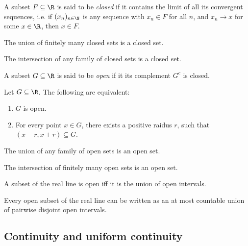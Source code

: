 \documentclass{article}
\begin{document}
\begin{definition}
	A subset $F\subseteq\R$ is said to be \emph{closed} if it contains the limit of all
	its convergent sequences, i.e. if $(x_n)_{n\in\N}$ is any sequence with $x_n\in F$
	for all $n$, and $x_n\to x$ for some $x\in\R$, then $x\in F$.
\end{definition}

\begin{proposition}[2.2]
	The union of finitely many closed sets is a closed set.
\end{proposition}

\begin{proposition}[2.4]
	The intersection of any family of closed sets is a closed set.
\end{proposition}

\begin{definition}
	A subset $G\subseteq\R$ is said to be \emph{open} if it its complement $G^c$ is closed.
\end{definition}

\begin{proposition}[2.6]
	Let $G\subseteq\R$. The following are equivalent:
	\begin{enumerate}
		\item $G$ is open.
		\item For every point $x\in G$, there exists a positive raidus $r$, such that
		      $(x-r,x+r)\subseteq G$.
	\end{enumerate}
\end{proposition}

\begin{proposition}[2.8]
	The union of any family of open sets is an open set.
\end{proposition}

\begin{proposition}[2.9]
	The intersection of finitely many open sets is an open set.
\end{proposition}

\begin{theorem}[2.10]
	A subset of the real line is open iff it is the union of open intervals.
\end{theorem}

\begin{theorem}[2.11]
	Every open subset of the real line can be written as an at most countable union
	of pairwise disjoint open intervals.
\end{theorem}

\subsection{Continuity and uniform continuity}
\end{document}
